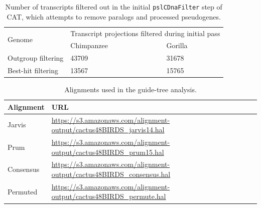 \documentclass{article}
\begin{document}
\begin{table}
\begin{center}
\begin{tabular}{lll}
\toprule
\multirow{2}{*}{Genome} & \multicolumn{2}{c}{Transcript projections filtered during initial pass} \\
\cmidrule{2-3}
& Chimpanzee & Gorilla  \\
\midrule
Outgroup filtering & 43709 & 31678\\
Best-hit filtering & 13567 & 15765\\
\bottomrule
\end{tabular}
\caption[Number of transcripts filtered in initial step of CAT]{Number of transcripts filtered out in the initial \texttt{pslCDnaFilter} step of CAT, which attempts to remove paralogs and processed pseudogenes.}\label{tab:mapqCatCDNAFilter}
\end{center}
\end{table}

\begin{table}
\begin{center}
\begin{tabular}{l|l}
Alignment & URL\\
\hline
Jarvis & \url{https://s3.amazonaws.com/alignment-output/cactus48BIRDS_jarvis14.hal} \\
Prum & \url{https://s3.amazonaws.com/alignment-output/cactus48BIRDS_prum15.hal} \\
Consensus & \url{https://s3.amazonaws.com/alignment-output/cactus48BIRDS_consensus.hal} \\
Permuted & \url{https://s3.amazonaws.com/alignment-output/cactus48BIRDS_permute.hal} \\
\end{tabular}
\caption{Alignments used in the guide-tree analysis.}\label{tab:guideTreeURLs}
\end{center}
\end{table}
\end{document}
